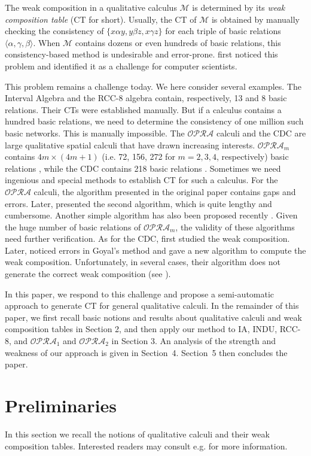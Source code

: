 \documentclass{llncs}
\newcommand{\qcm}{\mathcal{M}}
\newcommand{\opra}{\mathcal{OPRA}}
\begin{document}
The weak composition in a qualitative calculus $\qcm$ is determined by its \emph{weak composition table} (CT for short). Usually, the CT of $\qcm$ is obtained by manually checking the consistency of $\{x\alpha y, y\beta z, x\gamma z\}$ for each triple of basic relations $\langle\alpha,\gamma,\beta\rangle$. When  $\qcm$ contains dozens or even hundreds of basic relations, this consistency-based method is undesirable and error-prone.   \cite{Cohn95} first noticed this problem and identified it as a challenge for computer scientists.

This problem remains a challenge today. We here consider several examples. The Interval Algebra and the RCC-8 algebra contain, respectively, 13 and 8 basic relations. Their CTs were established manually. But if a calculus contains  a hundred basic relations, we need to determine the consistency of one million such basic networks. This is manually impossible. The $\opra$ calculi and the CDC are large qualitative spatial calculi that have drawn increasing interests.  $\opra_m$ contains $4m\times (4m+1)$ (i.e. 72, 156, 272 for $m=2,3,4$, respectively) basic relations \cite{Moratz06}, while the CDC contains 218 basic relations \cite{Goyal00}.  Sometimes we need ingenious and special methods to establish CT for such a calculus. For the $\opra$ calculi,  the algorithm presented in the original paper \cite{Moratz06} contains gaps and errors.  Later, \cite{Frommberger+07} presented the second algorithm, which is quite lengthy and cumbersome. Another simple algorithm has also been proposed recently \cite{MM10}. Given the huge number of basic relations of $\opra_m$, the validity of these algorithms need further verification. As for the CDC, \cite{Goyal00} first studied the weak composition. Later, \cite{SkiadopoulosK04} noticed errors in Goyal's method and gave a new algorithm to compute the weak composition. Unfortunately, in several cases, their algorithm does not generate the correct weak composition (see \cite{LiuZLY10}).


In this paper, we respond to this challenge and propose a semi-automatic approach to generate CT for general qualitative calculi. In the remainder of this paper, we first recall basic notions and results about qualitative calculi and weak composition tables in Section 2, and then apply our method to IA, INDU, RCC-8, and $\opra_1$ and $\opra_2$ in Section 3. An analysis of the strength and weakness of our approach is given in Section~4. Section~5 then concludes the paper.

\section{Preliminaries}
In this section we recall the notions of qualitative calculi and their weak composition tables. Interested readers may consult e.g. \cite{LigozatR04,RenzL05} for more information.
\end{document}

